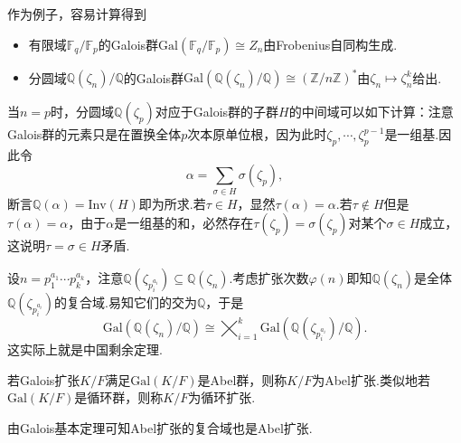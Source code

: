 作为例子，容易计算得到
\begin{itemize}
    \item 有限域$\mathbb{F}_q/\mathbb{F}_p$的Galois群$\mathrm{Gal}(\mathbb{F}_q/\mathbb{F}_p)\cong Z_n$由Frobenius自同构生成.
    \item 分圆域$\mathbb{Q}(\zeta_n)/\mathbb{Q}$的Galois群$\mathrm{Gal}(\mathbb{Q}(\zeta_n)/\mathbb{Q})\cong(\mathbb{Z}/n\mathbb{Z})^*$由$\zeta_n\mapsto\zeta_n^k$给出.
\end{itemize}
\begin{remark}
    当$n=p$时，分圆域$\mathbb{Q}(\zeta_p)$对应于Galois群的子群$H$的中间域可以如下计算：注意Galois群的元素只是在置换全体$p$次本原单位根，因为此时$\zeta_p,\cdots,\zeta_p^{p-1}$是一组基.因此令
    \[
        \alpha=\sum_{\sigma\in H}\sigma(\zeta_p),
    \]
    断言$\mathbb{Q}(\alpha)=\mathrm{Inv}(H)$即为所求.若$\tau\in H$，显然$\tau(\alpha)=\alpha$.若$\tau\notin H$但是$\tau(\alpha)=\alpha$，由于$\alpha$是一组基的和，必然存在$\tau(\zeta_p)=\sigma(\zeta_p)$对某个$\sigma\in H$成立，这说明$\tau=\sigma\in H$矛盾.
\end{remark}

设$n=p_1^{a_1}\cdots p_k^{a_k}$，注意$\mathbb{Q}(\zeta_{p_i^{a_i}})\subseteq\mathbb{Q}(\zeta_n)$.考虑扩张次数$\varphi(n)$即知$\mathbb{Q}(\zeta_n)$是全体$\mathbb{Q}(\zeta_{p_i^{a_i}})$的复合域.易知它们的交为$\mathbb{Q}$，于是
\[
    \mathrm{Gal}(\mathbb{Q}(\zeta_n)/\mathbb{Q})\cong\bigtimes_{i=1}^k\mathrm{Gal}(\mathbb{Q}(\zeta_{p_i^{a_i}})/\mathbb{Q}).
\]
这实际上就是中国剩余定理.

\begin{definition}
    若Galois扩张$K/F$满足$\mathrm{Gal}(K/F)$是Abel群，则称$K/F$为{\heiti Abel扩张}.类似地若$\mathrm{Gal}(K/F)$是循环群，则称$K/F$为{\heiti 循环扩张}.
\end{definition}

由Galois基本定理可知Abel扩张的复合域也是Abel扩张.

